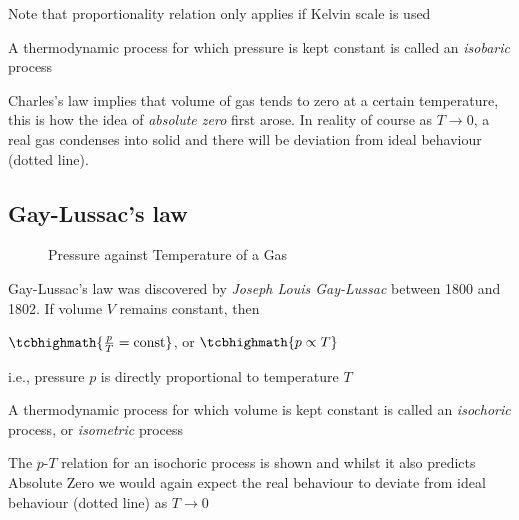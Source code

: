 \cmt Note that proportionality relation only applies if Kelvin scale is used

A thermodynamic process for which pressure is kept constant is called an \emph{isobaric} process


\cmt Charles's law implies that volume of gas tends to zero at a certain temperature, this is how the idea of \emph{absolute zero} first arose. In reality of course as $T\to0$, a real gas condenses into solid and there will be deviation from ideal behaviour (dotted line).



\subsection*{Gay-Lussac's law}

\begin{figure}
		\caption{Pressure against Temperature of a Gas}
\end{figure}

Gay-Lussac's law was discovered by \emph{Joseph Louis Gay-Lussac} between 1800 and 1802. If volume $V$ remains constant, then

{
	
	\centering
	
	$\tcbhighmath{\frac{p}{T}=\text{const}}$, or $\tcbhighmath{p \propto T}$
	
} 

i.e., pressure $p$ is directly proportional to temperature $T$

\cmt \piste A thermodynamic process for which volume is kept constant is called an \emph{isochoric} process, or \emph{isometric} process

The $p$-$T$ relation for an isochoric process is shown and whilst it also predicts Absolute Zero we would again expect the real behaviour to  deviate from ideal behaviour (dotted line) as $T\to0$


